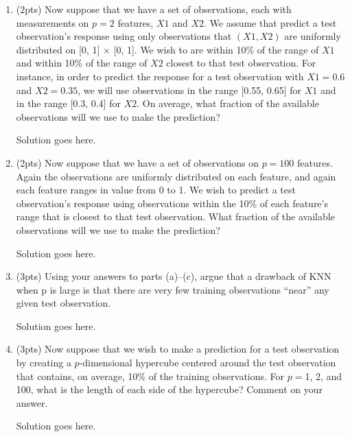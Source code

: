 \documentclass[a4paper]{article}
\theoremstyle{definition}
\newenvironment{soln}{
    \leavevmode\color{blue}\ignorespaces
}{}
\begin{document}
\begin{enumerate}
\begin{enumerate}
	
	\item (2pts) Now suppose that we have a set of observations, each with measurements on $p =2$ features, $X1$ and $X2$. We assume that predict a test observation’s response using only observations that $(X1,X2)$ are uniformly distributed on [0, 1] × [0, 1]. We wish to are within 10\% of the range of $X1$ and within 10\% of the range of $X2$ closest to that test observation. For instance, in order to predict the response for a test observation with $X1 =0.6$ and $X2 =0.35$, we will use observations in the range [0.55, 0.65] for $X1$ and in the range [0.3, 0.4] for $X2$. On average, what fraction of the available observations will we use to make the prediction?
	
	\begin{soln}  Solution goes here. \end{soln}
	
	\item (2pts) Now suppose that we have a set of observations on $p = 100$ features. Again the observations are uniformly distributed on each feature, and again each feature ranges in value from 0 to 1. We wish to predict a test observation’s response using observations within the 10\% of each feature’s range that is closest to that test observation. What fraction of the available observations will we use to make the prediction?
	
	\begin{soln}  Solution goes here. \end{soln}
	
	\item (3pts) Using your answers to parts (a)–(c), argue that a drawback of KNN when p is large is that there are very few training observations “near” any given test observation.
	
	\begin{soln}  Solution goes here. \end{soln}
	
	\item (3pts) Now suppose that we wish to make a prediction for a test observation by creating a $p$-dimensional hypercube centered around the test observation that contains, on average, 10\% of the training observations. For $p =$1, 2, and 100, what is the length of each side of the hypercube? Comment on your answer.
	
	\begin{soln}  Solution goes here. \end{soln}
	

\end{enumerate}
\end{enumerate}
\end{document}
